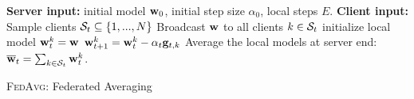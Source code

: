 \begin{algorithm}[h!]\small
\begin{algorithmic}[1]
\STATE \textbf{Server input:} initial model ${\mathbf{w}}_0$, initial step size $\alpha_0$, local steps $E$. 
\STATE \textbf{Client input:} 
\STATE  Sample clients ${\mathcal{S}}_t \subseteq \{1,...,N\}$
\STATE Broadcast ${\mathbf{w}}$ to all clients $k \in {\mathcal{S}}_t$
\STATE initialize local model ${\mathbf{w}}_t^k = {\mathbf{w}}$
\STATE ${\mathbf{w}}_{t+1}^{k}  ={\mathbf{w}}_{t}^{k}-\alpha_{t}{\mathbf{g}}_{t,k}$
\ENDFOR
\ENDFOR
\STATE Average the local models at server end: ${\overline{\mathbf{w}}}_t = \sum_{k\in {\mathcal{S}}_t} {\mathbf{w}}_t^k$.
\ENDFOR 
\end{algorithmic}
\caption{\textsc{FedAvg}: Federated Averaging}%
\label{alg:fedavg}
\end{algorithm}






